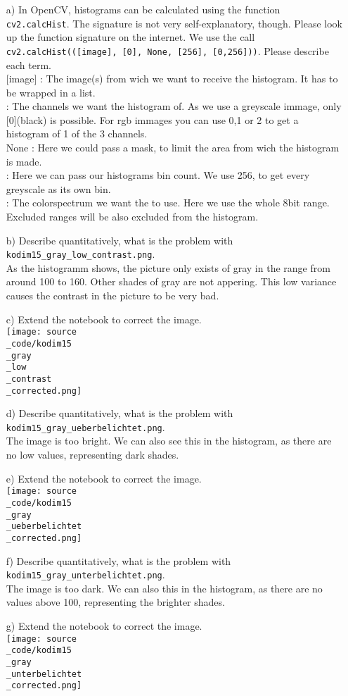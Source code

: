 \begin{enumerate}
\item[a)] In OpenCV, histograms can be calculated using the function \texttt{cv2.calcHist}. The signature is not very self-explanatory, though. Please look up
the function signature on the internet. We use the call \texttt{cv2.calcHist(([image], [0], None, [256], [0,256]))}. Please describe each term.\\

[image] : The image(s) from wich we want to receive the histogram. It has to be wrapped in a list.\\
[0] : The channels we want the histogram of. As we use a greyscale immage, only [0](black) is possible. For rgb immages you can use 0,1 or 2 to get a histogram of 1 of the 3 channels.\\
None : Here we could pass a mask, to limit the area from wich the histogram is made.\\
[256] : Here we can pass our histograms bin count. We use 256, to get every greyscale as its own bin.\\
[0,256] : The colorspectrum we want the to use. Here we use the whole 8bit range. Excluded ranges will be also excluded from the histogram.\\
\item[b)] Describe quantitatively, what is the problem with \texttt{kodim15\_gray\_low\_contrast.png}. \\

As the histogramm shows, the picture only exists of gray in the range from around 100 to 160. Other shades of gray are not appering. This low variance causes the contrast in the picture to be very bad.
\item[c)] Extend the notebook to correct the image. \\
\texttt{[image: source\\\_code/kodim15\\\_gray\\\_low\\\_contrast\\\_corrected.png]}

\item[d)] Describe quantitatively, what is the problem with \texttt{kodim15\_gray\_ueberbelichtet.png}. \\

The image is too bright. We can also see this in the histogram, as there are no low values, representing dark shades.
\item[e)] Extend the notebook to correct the image. \\
\texttt{[image: source\\\_code/kodim15\\\_gray\\\_ueberbelichtet\\\_corrected.png]}

\item[f)] Describe quantitatively, what is the problem with \texttt{kodim15\_gray\_unterbelichtet.png}. \\

The image is too dark. We can also this in the histogram, as there are no values above 100, representing the brighter shades.
\item[g)] Extend the notebook to correct the image. \\
\texttt{[image: source\\\_code/kodim15\\\_gray\\\_unterbelichtet\\\_corrected.png]}
\end{enumerate}

